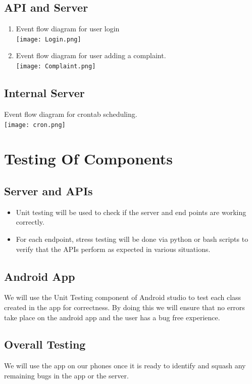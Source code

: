 \documentclass{article}
\begin{document}
			\subsection{API and Server}
			\begin{enumerate}
				\item Event flow diagram for user login \\
					\texttt{[image: Login.png]} \\
				\item Event flow diagram for user adding a complaint. \\
					\texttt{[image: Complaint.png]}
			\end{enumerate}
			\subsection{Internal Server}
				Event flow diagram for crontab scheduling. \\
					\texttt{[image: cron.png]}
	
	\section{Testing Of Components}
			\subsection{Server and APIs}
				\begin{itemize}
					\item Unit testing will be used to check if the server and end points are working correctly.
					\item For each endpoint, stress testing will be done via python or bash scripts to verify that the APIs perform as expected in various situations.
				\end{itemize}
			\subsection{Android App}
				We will use the Unit Testing component of Android studio to test each class created in the app for correctness. By doing this we will ensure that no errors take place on the android app and the user has a bug free experience.
			\subsection{Overall Testing}
				We will use the app on our phones once it is ready to identify and squash any remaining bugs in the app or the server. 	
\end{document}
